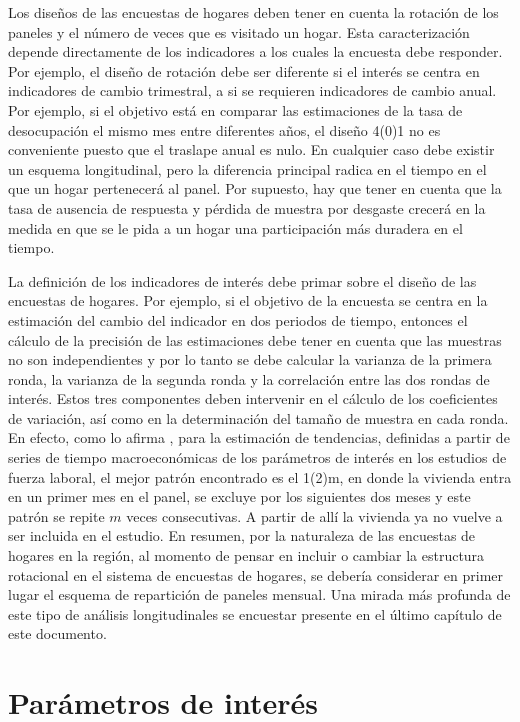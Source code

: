 \documentclass[12pt,spanish,]{book}
\begin{document}
Los diseños de las encuestas de hogares deben tener en cuenta la rotación de los paneles y el número de veces que es visitado un hogar. Esta caracterización depende directamente de los indicadores a los cuales la encuesta debe responder. Por ejemplo, el diseño de rotación debe ser diferente si el interés se centra en indicadores de cambio trimestral, a si se requieren indicadores de cambio anual. Por ejemplo, si el objetivo está en comparar las estimaciones de la tasa de desocupación el mismo mes entre diferentes años, el diseño 4(0)1 no es conveniente puesto que el traslape anual es nulo. En cualquier caso debe existir un esquema longitudinal, pero la diferencia principal radica en el tiempo en el que un hogar pertenecerá al panel. Por supuesto, hay que tener en cuenta que la tasa de ausencia de respuesta y pérdida de muestra por desgaste crecerá en la medida en que se le pida a un hogar una participación más duradera en el tiempo.

La definición de los indicadores de interés debe primar sobre el diseño de las encuestas de hogares. Por ejemplo, si el objetivo de la encuesta se centra en la estimación del cambio del indicador en dos periodos de tiempo, entonces el cálculo de la precisión de las estimaciones debe tener en cuenta que las muestras no son independientes y por lo tanto se debe calcular la varianza de la primera ronda, la varianza de la segunda ronda y la correlación entre las dos rondas de interés. Estos tres componentes deben intervenir en el cálculo de los coeficientes de variación, así como en la determinación del tamaño de muestra en cada ronda. En efecto, como lo afirma \textcite[pág. 236]{McLaren_Steel_2001}, para la estimación de tendencias, definidas a partir de series de tiempo macroeconómicas de los parámetros de interés en los estudios de fuerza laboral, el mejor patrón encontrado es el 1(2)m, en donde la vivienda entra en un primer mes en el panel, se excluye por los siguientes dos meses y este patrón se repite \(m\) veces consecutivas. A partir de allí la vivienda ya no vuelve a ser incluida en el estudio. En resumen, por la naturaleza de las encuestas de hogares en la región, al momento de pensar en incluir o cambiar la estructura rotacional en el sistema de encuestas de hogares, se debería considerar en primer lugar el esquema de repartición de paneles mensual. Una mirada más profunda de este tipo de análisis longitudinales se encuestar presente en el último capítulo de este documento.

\hypertarget{parametros-de-interes}{%
\section{Parámetros de interés}\label{parametros-de-interes}}
\end{document}
